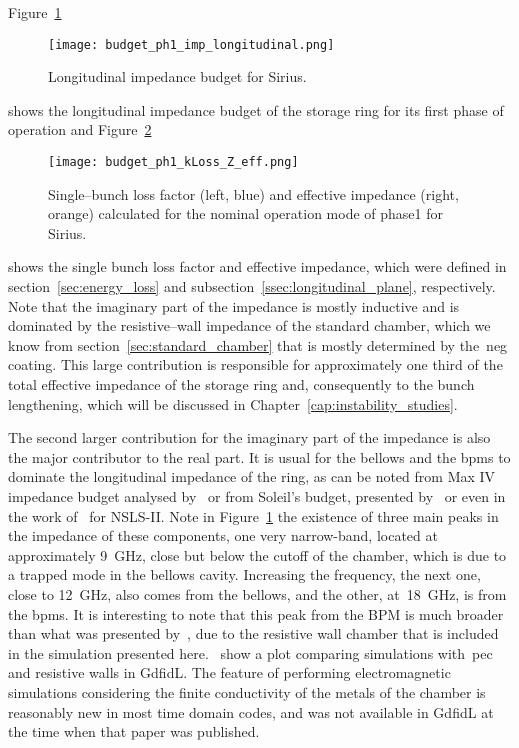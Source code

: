     Figure~\ref{fig:long_imp_budget}
    \begin{figure}
        \centering
        \texttt{[image: budget\_ph1\_imp\_longitudinal.png]}
        \caption{Longitudinal impedance budget for Sirius.}
        \label{fig:long_imp_budget}
    \end{figure}
    shows the longitudinal impedance budget of the storage ring for its first phase of operation and Figure~\ref{fig:ph1_kLoss_Z_eff}
    \begin{figure}
        \centering
        \texttt{[image: budget\_ph1\_kLoss\_Z\_eff.png]}
        \caption[Single--bunch loss factor for Sirius.]{Single--bunch loss factor (left, blue) and effective impedance (right, orange) calculated for the nominal operation mode of phase1 for Sirius.}
        \label{fig:ph1_kLoss_Z_eff}
    \end{figure}
    shows the single bunch loss factor and effective impedance, which were defined in section~\ref{sec:energy_loss} and subsection~\ref{ssec:longitudinal_plane}, respectively. Note that the imaginary part of the impedance is mostly inductive and is dominated by the resistive--wall impedance of the standard chamber, which we know from section~\ref{sec:standard_chamber} that is mostly determined by the~\gls{neg} coating. This large contribution is responsible for approximately one third of the total effective impedance of the storage ring and, consequently to the bunch lengthening, which will be discussed in Chapter~\ref{cap:instability_studies}.

    The second larger contribution for the imaginary part of the impedance is also the major contributor to the real part. It is usual for the bellows and the \glspl{bpm} to dominate the longitudinal impedance of the ring, as can be noted from Max IV impedance budget analysed by~ or from Soleil's budget, presented by~ or even in the work of~ for NSLS-II. Note in Figure~\ref{fig:long_imp_budget} the existence of three main peaks in the impedance of these components, one very narrow-band, located at approximately \SI{9}{\giga\hertz}, close but below the cutoff of the chamber,  which is due to a trapped mode in the bellows cavity. Increasing the frequency, the next one, close to \SI{12}{\giga\hertz}, also comes from the bellows, and the other, at~\SI{18}{\giga\hertz}, is from the \glspl{bpm}.
    It is interesting to note that this peak from the BPM is much broader than what was presented by~, due to the resistive wall chamber that is included in the simulation presented here.~ show a plot comparing simulations with~\gls{pec} and resistive walls in GdfidL. The feature of performing electromagnetic simulations considering the finite conductivity of the metals of the chamber is reasonably new in most time domain codes, and was not available in GdfidL at the time when that paper was published.

